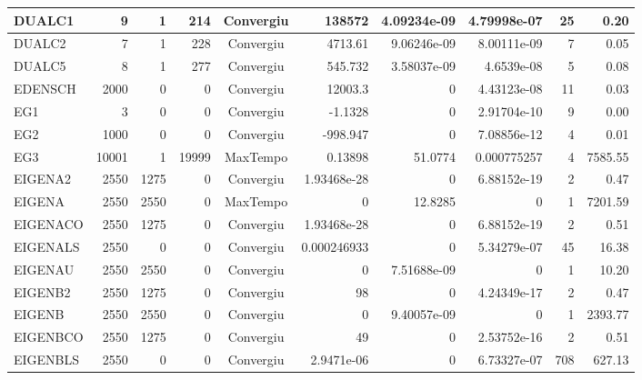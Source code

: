 \begin{center}
\begin{longtable}{|l|r|r|r|c|r|r|r|r|r|}
  DUALC1 &      9 &      1 &    214 & Convergiu  &      138572 &    4.09234e-09 & 4.79998e-07 &     25 &    0.20 \\ \hline
  DUALC2 &      7 &      1 &    228 & Convergiu  &     4713.61 &    9.06246e-09 & 8.00111e-09 &      7 &    0.05 \\ \hline
  DUALC5 &      8 &      1 &    277 & Convergiu  &     545.732 &    3.58037e-09 &  4.6539e-08 &      5 &    0.08 \\ \hline
 EDENSCH &   2000 &      0 &      0 & Convergiu  &     12003.3 &              0 & 4.43123e-08 &     11 &    0.03 \\ \hline
     EG1 &      3 &      0 &      0 & Convergiu  &     -1.1328 &              0 & 2.91704e-10 &      9 &    0.00 \\ \hline
     EG2 &   1000 &      0 &      0 & Convergiu  &    -998.947 &              0 & 7.08856e-12 &      4 &    0.01 \\ \hline
     EG3 &  10001 &      1 &  19999 & MaxTempo   &     0.13898 &        51.0774 & 0.000775257 &      4 & 7585.55 \\ \hline
 EIGENA2 &   2550 &   1275 &      0 & Convergiu  & 1.93468e-28 &              0 & 6.88152e-19 &      2 &    0.47 \\ \hline
  EIGENA &   2550 &   2550 &      0 & MaxTempo   &           0 &        12.8285 &           0 &      1 & 7201.59 \\ \hline
EIGENACO &   2550 &   1275 &      0 & Convergiu  & 1.93468e-28 &              0 & 6.88152e-19 &      2 &    0.51 \\ \hline
EIGENALS &   2550 &      0 &      0 & Convergiu  & 0.000246933 &              0 & 5.34279e-07 &     45 &   16.38 \\ \hline
 EIGENAU &   2550 &   2550 &      0 & Convergiu  &           0 &    7.51688e-09 &           0 &      1 &   10.20 \\ \hline
 EIGENB2 &   2550 &   1275 &      0 & Convergiu  &          98 &              0 & 4.24349e-17 &      2 &    0.47 \\ \hline
  EIGENB &   2550 &   2550 &      0 & Convergiu  &           0 &    9.40057e-09 &           0 &      1 & 2393.77 \\ \hline
EIGENBCO &   2550 &   1275 &      0 & Convergiu  &          49 &              0 & 2.53752e-16 &      2 &    0.51 \\ \hline
EIGENBLS &   2550 &      0 &      0 & Convergiu  &  2.9471e-06 &              0 & 6.73327e-07 &    708 &  627.13 \\ \hline

\end{longtable}
\end{center}
